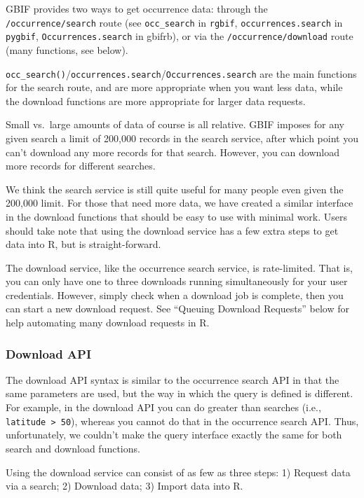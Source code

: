\documentclass[author-year, review, 11pt]{components/elsarticle} %
\begin{document}
GBIF provides two ways to get occurrence data: through the
\texttt{/occurrence/search} route (see \texttt{occ\_search} in
\texttt{rgbif}, \texttt{occurrences.search} in \texttt{pygbif},
\texttt{Occurrences.search} in gbifrb), or via the
\texttt{/occurrence/download} route (many functions, see below).

\texttt{occ\_search()}/\texttt{occurrences.search}/\texttt{Occurrences.search}
are the main functions for the search route, and are more appropriate
when you want less data, while the download functions are more
appropriate for larger data requests.

Small vs.~large amounts of data of course is all relative. GBIF imposes
for any given search a limit of 200,000 records in the search service,
after which point you can't download any more records for that search.
However, you can download more records for different searches.

We think the search service is still quite useful for many people even
given the 200,000 limit. For those that need more data, we have created
a similar interface in the download functions that should be easy to use
with minimal work. Users should take note that using the download
service has a few extra steps to get data into R, but is
straight-forward.

The download service, like the occurrence search service, is
rate-limited. That is, you can only have one to three downloads running
simultaneously for your user credentials. However, simply check when a
download job is complete, then you can start a new download request. See
``Queuing Download Requests'' below for help automating many download
requests in R.

\subsubsection{Download API}\label{download-api}

The download API syntax is similar to the occurrence search API in that
the same parameters are used, but the way in which the query is defined
is different. For example, in the download API you can do greater than
searches (i.e., \texttt{latitude\ \textgreater{}\ 50}), whereas you
cannot do that in the occurrence search API. Thus, unfortunately, we
couldn't make the query interface exactly the same for both search and
download functions.

Using the download service can consist of as few as three steps: 1)
Request data via a search; 2) Download data; 3) Import data into R.
\end{document}

